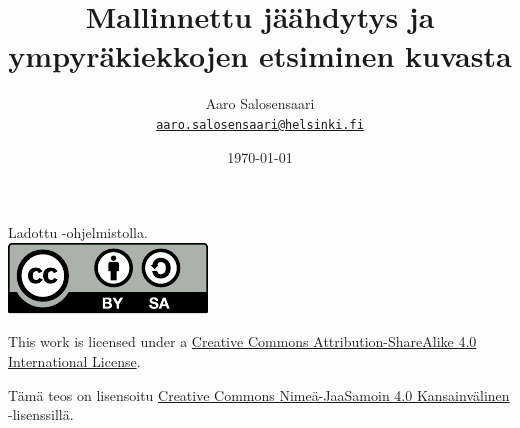 \documentclass[11pt,a4paper,leqno]{report}
\newcommand{\Author}{Aaro Salosensaari}
\newcommand{\Title}{Mallinnettu jäähdytys ja ympyräkiekkojen etsiminen kuvasta}
\begin{document}
    \title{\Title}

    \author{\Author\\
        \small{ \texttt{\href{mailto:aaro.salosensaari@helsinki.fi}{aaro.salosensaari@helsinki.fi}}}
    }

    \date{\today}

    

    \newpage

    \thispagestyle{empty}
    \null
    \vfill
    \begin{center}
        Ladottu \LuaLaTeX-ohjelmistolla.\\\vspace{2em}
        \includegraphics[width=0.2\linewidth]{figures/by-sa.pdf}

        \noindent
        This work is licensed under a \href{http://creativecommons.org/licenses/by-sa/4.0/}{Creative Commons Attribution-ShareAlike 4.0 International License}.

        \noindent
        Tämä teos on lisensoitu \href{http://creativecommons.org/licenses/by-sa/4.0/}{Creative Commons Nimeä-JaaSamoin 4.0 Kansainvälinen} -lisenssillä.
    \end{center}

    {\small
        \tableofcontents
        \setcounter{page}{1}
    }

    
    
    
    
    
    

    \printbibliography[heading=bibintoc]
\end{document}
